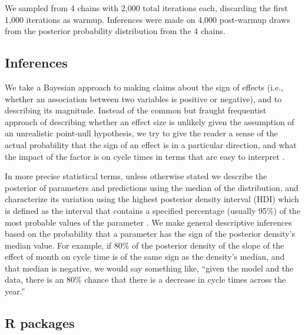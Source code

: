 \documentclass[manuscript,screen,review]{acmart}
\begin{document}
We sampled from 4 chains with 2,000 total iterations each, discarding
the first 1,000 iterations as warmup. Inferences were made on 4,000
post-warmup draws from the posterior probability distribution from the 4
chains.

\subsection{Inferences}\label{inferences}

We take a Bayesian approach to making claims about the sign of effects
(i.e., whether an association between two variables is positive or
negative), and to describing its magnitude. Instead of the common but
fraught frequentist approach of describing whether an effect size is
unlikely given the assumption of an unrealistic point-null hypothesis,
we try to give the reader a sense of the actual probability that the
sign of an effect is in a particular direction, and what the impact of
the factor is on cycle times in terms that are easy to interpret
\citep{GelmanPowerCalculationsAssessing2014}.

In more precise statistical terms, unless otherwise stated we describe
the posterior of parameters and predictions using the median of the
distribution, and characterize its variation using the highest posterior
density interval (HDI) which is defined as the interval that contains a
specified percentage (usually 95\%) of the most probable values of the
parameter \citep{kruschkeRejectingAcceptingParameter2018}. We make
general descriptive inferences based on the probability that a parameter
has the sign of the posterior density's median value. For example, if
80\% of the posterior density of the slope of the effect of month on
cycle time is of the same sign as the density's median, and that median
is negative, we would say something like, ``given the model and the
data, there is an 80\% chance that there is a decrease in cycle times
across the year.''

\subsection{R packages}\label{r-packages}
\end{document}
